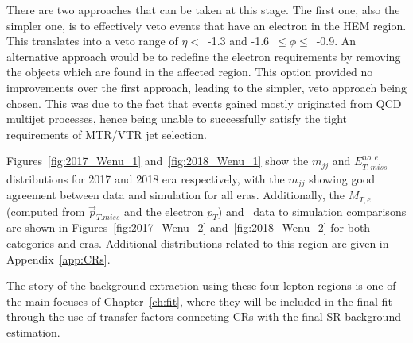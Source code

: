 \hspace{10pt} There are two approaches that can be taken at this stage. The first one, also the simpler one, is to effectively veto events that have an electron in the HEM region. This translates into a veto range of $\eta <$~-1.3 and -1.6~$\leq\phi\leq$~-0.9. An alternative approach would be to redefine the electron requirements by removing the objects which are found in the affected region. This option provided no improvements over the first approach, leading to the simpler, veto approach being chosen. This was due to the fact that events gained mostly originated from QCD multijet processes, hence being unable to successfully satisfy the tight requirements of MTR/VTR jet selection.

\hspace{10pt} Figures~\ref{fig:2017_Wenu_1} and~\ref{fig:2018_Wenu_1} show the $m_{jj}$ and $E_{T,miss}^{no,e}$ distributions for 2017 and 2018 era respectively, with the $m_{jj}$ showing good agreement between data and simulation for all eras. Additionally, the $M_{T,e}$ (computed from $\vec{p}_{T.miss}$ and the electron $p_T$) and \mindphinoe~data to simulation comparisons are shown in Figures~\ref{fig:2017_Wenu_2} and~\ref{fig:2018_Wenu_2} for both categories and eras. Additional distributions related to this region are given in Appendix~\ref{app:CRs}. 

\hspace{10pt} The story of the background extraction using these four lepton regions is one of the main focuses of Chapter~\ref{ch:fit}, where they will be included in the final fit through the use of transfer factors connecting CRs with the final SR background estimation.


